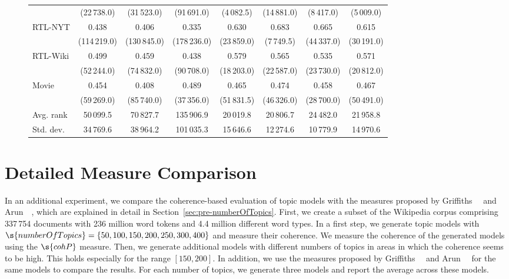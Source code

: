 \begin{sidewaysfigure}
\begin{tabular}{@{}lccccccc@{}}
& (22\,738.0) & (31\,523.0) & (91\,691.0) & (4\,082.5) & (14\,881.0) & (8\,417.0) & (5\,009.0) \\
\multirow{2}{*}{RTL-NYT} &
\multicolumn{1}{c}{0.438} & \multicolumn{1}{c}{0.406} & \multicolumn{1}{c}{0.335} & \multicolumn{1}{c}{0.630} & \multicolumn{1}{c}{0.683} & \multicolumn{1}{c}{0.665} & \multicolumn{1}{c}{0.615} \\
& (114\,219.0) & (130\,845.0) & (178\,236.0) & (23\,859.0) & (7\,749.5) & (44\,337.0) & (30\,191.0) \\
\multirow{2}{*}{RTL-Wiki} &
\multicolumn{1}{c}{0.499} & \multicolumn{1}{c}{0.459} & \multicolumn{1}{c}{0.438} & \multicolumn{1}{c}{0.579} & \multicolumn{1}{c}{0.565} & \multicolumn{1}{c}{0.535} & \multicolumn{1}{c}{0.571} \\
& (52\,244.0) & (74\,832.0) & (90\,708.0) & (18\,203.0) & (22\,587.0) & (23\,730.0) & (20\,812.0) \\
\multirow{2}{*}{Movie} &
\multicolumn{1}{c}{0.454} & \multicolumn{1}{c}{0.408} & \multicolumn{1}{c}{0.489} & \multicolumn{1}{c}{0.465} & \multicolumn{1}{c}{0.474} & \multicolumn{1}{c}{0.458} & \multicolumn{1}{c}{0.467} \\
& (59\,269.0) & (85\,740.0) & (37\,356.0) & (51\,831.5) & (46\,326.0) & (28\,700.0) & (50\,491.0) \\
\midrule
Avg. rank & 50\,099.5 & 70\,827.7 & 135\,906.9 & 20\,019.8 & 20\,806.7 & 24\,482.0 & 21\,958.8 \\
Std. dev. & 34\,769.6 & 38\,964.2 & 101\,035.3 & 15\,646.6 & 12\,274.6 & 10\,779.9 & 14\,970.6 \\
\bottomrule
\end{tabular}
\end{sidewaysfigure}

\clearpage%

\section{Detailed Measure Comparison}
\label{sec:ap-lodcat-small-corpus}

In an additional experiment, we compare the coherence-based evaluation of topic models with the measures proposed by Griffiths~\etal~\cite{Griffiths2004} and Arun~\etal~\cite{Arun2010}, which are explained in detail in Section~\ref{sec:pre-numberOfTopics}.
First, we create a subset of the Wikipedia corpus comprising 337\,754 documents with 236 million word tokens and 4.4 million different word types.
In a first step, we generate topic models with $\s{numberOfTopics}=\{50,100,150,200,250,300,400\}$ and measure their coherence. We measure the coherence of the generated models using the $\s{cohP}$ measure. Then, we generate additional models with different numbers of topics in areas in which the coherence seems to be high. This holds especially for the range $[150,200]$. In addition, we use the measures proposed by Griffiths~\etal~\cite{Griffiths2004} and Arun~\etal~\cite{Arun2010} for the same models to compare the results. For each number of topics, we generate three models and report the average across these models.

